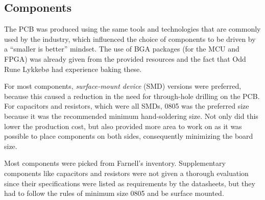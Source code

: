 
\subsection{Components}

The PCB was produced using the same tools and technologies that are commonly
used by the industry, which influenced the choice of components to be driven by
a ``smaller is better'' mindset. The use of BGA packages (for the MCU and FPGA)
was already given from the provided resources and the fact that Odd Rune Lykkebø
had experience baking these.

For most components, \emph{surface-mount device} (SMD) versions were
preferred, because this caused a reduction in the need for through-hole drilling
on the PCB. For capacitors and resistors, which were all SMDs, 0805 was the preferred size because it
was the recommended minimum hand-soldering size. Not only did this lower the
production cost, but also provided more area to work on as it was possible to
place components on both sides, consequently minimizing the board size.

Most components were picked from Farnell's inventory. Supplementary components
like capacitors and resistors were not given a thorough evaluation since their
specifications were listed as requirements by the datasheets, but they had to
follow the rules of minimum size 0805 and be surface mounted.







